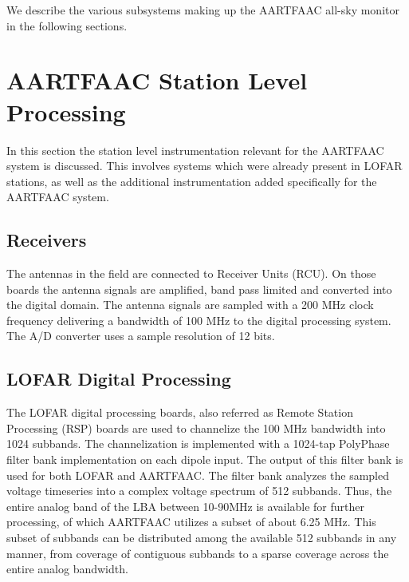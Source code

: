 \documentclass{ws-jai}
\begin{document}
We describe the various subsystems making up the AARTFAAC all-sky monitor in the
following sections.

\section {\label{sec:station_hardware} AARTFAAC Station Level Processing}
In  this section  the station  level instrumentation  relevant for  the AARTFAAC
system is discussed.  This involves systems which were already  present in LOFAR
stations, as well  as the additional instrumentation added  specifically for the
AARTFAAC system.
\subsection {Receivers}  The  antennas  in the  field  are connected  to
Receiver Units  (RCU). On those boards  the antenna signals are  amplified, band
pass limited  and converted into  the digital  domain.  The antenna  signals are
sampled with a 200 MHz clock frequency  delivering a bandwidth of 100 MHz to the
digital processing  system. The  A/D converter  uses a  sample resolution  of 12
bits.

\subsection  {LOFAR Digital  Processing}  The  LOFAR digital  processing
boards, also  referred as  Remote Station  Processing (RSP)  boards are  used to
channelize  the 100  MHz bandwidth  into 1024  subbands.  The  channelization is
implemented with a 1024-tap PolyPhase  filter bank implementation on each dipole
input. The output of  this filter bank is used for both  LOFAR and AARTFAAC. The
filter  bank analyzes  the sampled  voltage  timeseries into  a complex  voltage
spectrum  of 512  subbands. Thus,  the  entire analog  band of  the LBA  between
10-90MHz  is available  for further  processing,  of which  AARTFAAC utilizes  a
subset of about 6.25 MHz.  This subset  of subbands can be distributed among the
available 512 subbands in any manner,  from coverage of contiguous subbands to a
sparse coverage across the entire analog bandwidth.
\end{document}
